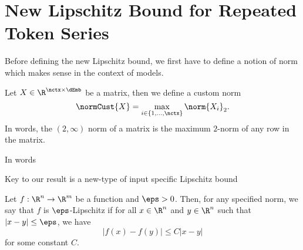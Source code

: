 \section{New Lipschitz Bound for Repeated Token Series}

Before defining the new Lipschitz bound, we first have to define a notion of norm which makes sense in the context of models.
\begin{definition}
Let $X \in \R^{\nctx \times \dEmb}$ be a matrix, then we define a custom norm
\[
	\normCust{X} = \max_{i \in \{1, \ldots, \nctx\}} \norm{X_{i}}_2.
\]
In words, the $(2, \infty)$ norm of a matrix is the maximum $2$-norm of any row in the matrix.
\end{definition}
In words

Key to our result is a new-type of input specific Lipschitz bound

\begin{definition}
	Let $f: \R^n \to \R^m$ be a function and $\eps > 0$.
	Then, for any specified norm,
	we say that $f$ is $\eps$-Lipschitz if for all $x \in \R^n$ and $y \in \R^n$ such that $|x - y| \leq \eps$, we have
	\[
		|f(x) - f(y)| \leq C |x - y|
	\]
	for some constant $C$.
\end{definition}

